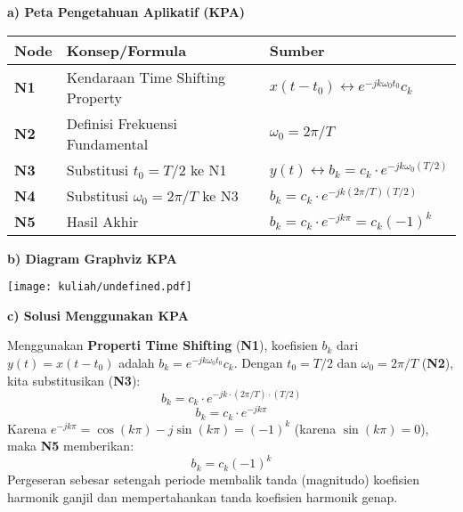 \documentclass[
  letterpaper,
  DIV=11,
  numbers=noendperiod]{scrreprt}
\begin{document}
\textbf{a) Peta Pengetahuan Aplikatif (KPA)}

\begin{longtable}[]{@{}
  >{\centering\arraybackslash}p{}
  >{\raggedright\arraybackslash}p{}
  >{\raggedright\arraybackslash}p{}@{}}
\toprule\noalign{}
\begin{minipage}[b]{\linewidth}\centering
Node
\end{minipage} & \begin{minipage}[b]{\linewidth}\raggedright
Konsep/Formula
\end{minipage} & \begin{minipage}[b]{\linewidth}\raggedright
Sumber
\end{minipage} \\
\midrule\noalign{}
\endhead
\bottomrule\noalign{}
\endlastfoot
\textbf{N1} & Kendaraan Time Shifting Property &
\(x(t-t_0) \leftrightarrow e^{-jk\omega_0 t_0} c_k\) \\
\textbf{N2} & Definisi Frekuensi Fundamental & \(\omega_0 = 2\pi/T\) \\
\textbf{N3} & Substitusi \(t_0 = T/2\) ke N1 &
\(y(t) \leftrightarrow b_k = c_k \cdot e^{-jk\omega_0 (T/2)}\) \\
\textbf{N4} & Substitusi \(\omega_0 = 2\pi/T\) ke N3 &
\(b_k = c_k \cdot e^{-jk(2\pi/T)(T/2)}\) \\
\textbf{N5} & Hasil Akhir &
\(b_k = c_k \cdot e^{-jk\pi} = c_k (-1)^k\) \\
\end{longtable}

\textbf{b) Diagram Graphviz KPA}

\texttt{[image: kuliah/undefined.pdf]}

\textbf{c) Solusi Menggunakan KPA}

Menggunakan \textbf{Properti Time Shifting} (\textbf{N1}), koefisien
\(b_k\) dari \(y(t) = x(t - t_0)\) adalah
\(b_k = e^{-jk\omega_0 t_0} c_k\). Dengan \(t_0 = T/2\) dan
\(\omega_0 = 2\pi/T\) (\textbf{N2}), kita substitusikan (\textbf{N3}):
\[b_k = c_k \cdot e^{-jk \cdot (2\pi/T) \cdot (T/2)}\]
\[b_k = c_k \cdot e^{-jk\pi}\] Karena
\(e^{-jk\pi} = \cos(k\pi) - j \sin(k\pi) = (-1)^k\) (karena
\(\sin(k\pi)=0\)), maka \textbf{N5} memberikan: \[b_k = c_k (-1)^k\]
Pergeseran sebesar setengah periode membalik tanda (magnitudo) koefisien
harmonik ganjil dan mempertahankan tanda koefisien harmonik genap.
\end{document}
